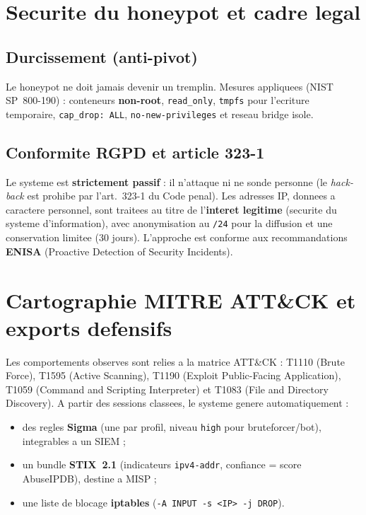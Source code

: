 \documentclass[11pt,a4paper]{article}
\begin{document}
\section{Securite du honeypot et cadre legal}
\subsection{Durcissement (anti-pivot)}
Le honeypot ne doit jamais devenir un tremplin. Mesures appliquees (NIST SP~800-190) :
conteneurs \textbf{non-root}, \texttt{read\_only}, \texttt{tmpfs} pour l'ecriture
temporaire, \texttt{cap\_drop: ALL}, \texttt{no-new-privileges} et reseau bridge isole.

\subsection{Conformite RGPD et article 323-1}
Le systeme est \textbf{strictement passif} : il n'attaque ni ne sonde personne (le
\textit{hack-back} est prohibe par l'art.~323-1 du Code penal). Les adresses IP, donnees
a caractere personnel, sont traitees au titre de l'\textbf{interet legitime} (securite
du systeme d'information), avec anonymisation au \texttt{/24} pour la diffusion et une
conservation limitee (30 jours). L'approche est conforme aux recommandations
\textbf{ENISA} (Proactive Detection of Security Incidents).

\section{Cartographie MITRE ATT\&CK et exports defensifs}
Les comportements observes sont relies a la matrice ATT\&CK : T1110 (Brute Force),
T1595 (Active Scanning), T1190 (Exploit Public-Facing Application), T1059 (Command and
Scripting Interpreter) et T1083 (File and Directory Discovery). A partir des sessions
classees, le systeme genere automatiquement :
\begin{itemize}[leftmargin=1.5em,noitemsep]
  \item des regles \textbf{Sigma} (une par profil, niveau \texttt{high} pour
        bruteforcer/bot), integrables a un SIEM ;
  \item un bundle \textbf{STIX~2.1} (indicateurs \texttt{ipv4-addr}, confiance = score
        AbuseIPDB), destine a MISP ;
  \item une liste de blocage \textbf{iptables} (\texttt{-A INPUT -s <IP> -j DROP}).
\end{itemize}
\end{document}
